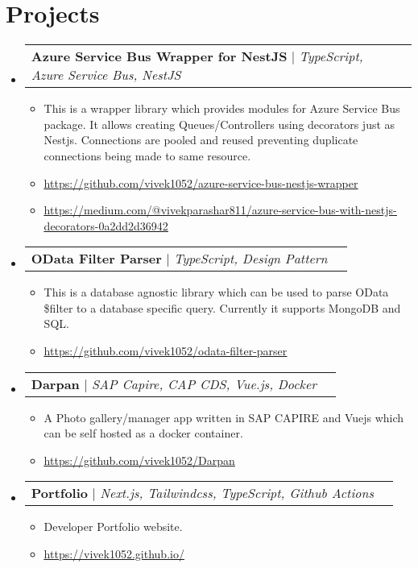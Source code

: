 \documentclass[letterpaper,11pt]{article}
\makeatletter
\newcommand{\resumeItem}[1]{
  \item\small{
    {#1 \vspace{-2pt}}
  }
}
\newcommand{\resumeProjectHeading}[2]{
    \item
    \begin{tabular*}{0.97\textwidth}{l@{\extracolsep{\fill}}r}
      \small#1 & #2 \\
    \end{tabular*}\vspace{-7pt}
}
\newcommand{\resumeSubHeadingListStart}{\begin{itemize}[leftmargin=0.15in, label={}]}
\newcommand{\resumeSubHeadingListEnd}{\end{itemize}}
\newcommand{\resumeItemListStart}{\begin{itemize}}
\newcommand{\resumeItemListEnd}{\end{itemize}\vspace{-5pt}}
\makeatother
\begin{document}
\section{Projects}
    \resumeSubHeadingListStart
      \resumeProjectHeading
          {\textbf{Azure Service Bus Wrapper for NestJS} $|$ \emph{TypeScript, Azure Service Bus, NestJS}}{}
          \resumeItemListStart
            \resumeItem{This is a wrapper library which provides modules for Azure Service Bus package. It allows creating Queues/Controllers using decorators just as Nestjs. Connections are pooled and reused preventing duplicate connections being made to same resource.}
            \resumeItem{\href{https://github.com/vivek1052/azure-service-bus-nestjs-wrapper}{\underline{https://github.com/vivek1052/azure-service-bus-nestjs-wrapper}}}
            \resumeItem{\href{https://medium.com/@vivekparashar811/azure-service-bus-with-nestjs-decorators-0a2dd2d36942}{\underline{https://medium.com/@vivekparashar811/azure-service-bus-with-nestjs-decorators-0a2dd2d36942}}}
          \resumeItemListEnd
          
      \resumeProjectHeading
          {\textbf{OData Filter Parser} $|$ \emph{TypeScript, Design Pattern}}{}
          \resumeItemListStart
            \resumeItem{This is a database agnostic library which can be used to parse OData \$filter to a database specific query. Currently it supports MongoDB and SQL.}
           \resumeItem{\href{https://github.com/vivek1052/odata-filter-parser}{\underline{https://github.com/vivek1052/odata-filter-parser}}}
          \resumeItemListEnd

      \resumeProjectHeading
          {\textbf{Darpan} $|$ \emph{SAP Capire, CAP CDS, Vue.js, Docker}}{}
          \resumeItemListStart
            \resumeItem{A Photo gallery/manager app written in SAP CAPIRE and Vuejs which can be self hosted as a docker container.}
           \resumeItem{\href{https://github.com/vivek1052/Darpan}{\underline{https://github.com/vivek1052/Darpan}}}
          \resumeItemListEnd

       \resumeProjectHeading
          {\textbf{Portfolio} $|$ \emph{Next.js, Tailwindcss, TypeScript, Github Actions}}{}
          \resumeItemListStart
            \resumeItem{Developer Portfolio website.}
           \resumeItem{\href{https://vivek1052.github.io/}{\underline{https://vivek1052.github.io/}}}
          \resumeItemListEnd
          
    \resumeSubHeadingListEnd

\end{document}
